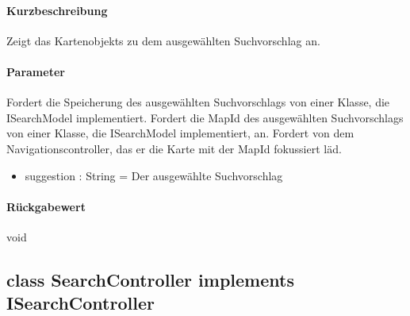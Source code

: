 \paragraph*{Kurzbeschreibung}
Zeigt das Kartenobjekts zu dem ausgewählten Suchvorschlag an.
\paragraph*{Parameter}
Fordert die Speicherung des ausgewählten Suchvorschlags von einer Klasse, die ISearchModel implementiert.
Fordert die MapId des ausgewählten Suchvorschlags von einer Klasse, die ISearchModel implementiert, an.
Fordert von dem Navigationscontroller, das er die Karte mit der MapId fokussiert läd.
\begin{itemize}
    \item suggestion : String = Der ausgewählte Suchvorschlag
\end{itemize}
\paragraph*{Rückgabewert}
void

\subsection{class SearchController implements ISearchController}